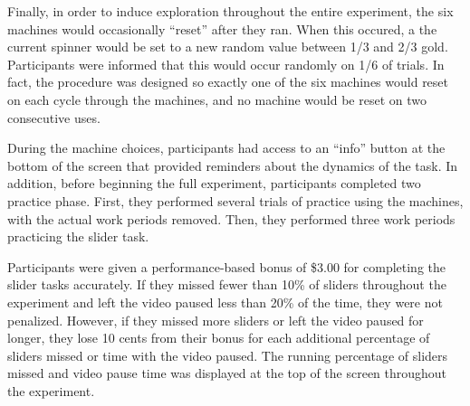 \documentclass[10pt,letterpaper]{article}
\begin{document}
Finally, in order to induce exploration throughout the entire experiment, the
six machines would occasionally ``reset'' after they ran. When this occured, a
the current spinner would be set to a new random value between 1/3 and 2/3 gold.
Participants were informed that this would occur randomly on
1/6 of trials. In fact, the procedure was designed so exactly one of the six
machines would reset on each cycle through the machines, and no machine would be
reset on two consecutive uses.

During the machine choices, participants had access to an ``info'' button at the
bottom of the screen that provided reminders about the dynamics of the task. In
addition, before beginning the full experiment, participants completed two
practice phase. First, they performed several trials of practice using the
machines, with the actual work periods removed. Then, they performed three work
periods practicing the slider task.

Participants were given a performance-based bonus of \$3.00 for completing the
slider tasks accurately. If they missed fewer than 10\% of sliders throughout
the experiment and left the video paused less than 20\% of the time, they were
not penalized. However, if they missed more sliders or left the video paused for
longer, they lose 10 cents from their bonus for each additional percentage of
sliders missed or time with the video paused. The running percentage of sliders
missed and video pause time was displayed at the top of the screen throughout
the experiment.


  
\end{document}
